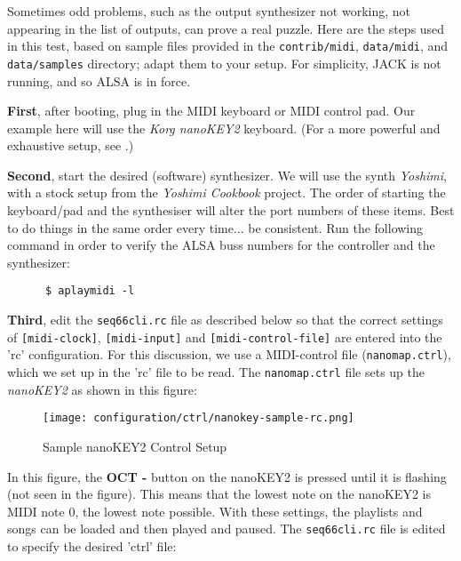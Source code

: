    Sometimes odd problems, such as the output synthesizer not working, not
   appearing in the list of outputs, can prove a real puzzle.
   Here are the steps used in this test, based on sample files provided in the
   \texttt{contrib/midi}, \texttt{data/midi}, and \texttt{data/samples}
   directory; adapt them to your setup.  For
   simplicity, JACK is not running, and so ALSA is in force.

   \textbf{First}, after booting, plug in the MIDI keyboard or MIDI control
   pad.  Our example here will use the \textsl{Korg nanoKEY2} keyboard.  
   (For a more powerful and exhaustive setup, see
   .)

   \textbf{Second}, start the desired (software) synthesizer.  We will use the
   synth \textsl{Yoshimi}, with a stock setup from the
   \textsl{Yoshimi Cookbook} project.
   The order of starting the keyboard/pad and the synthesiser
   will alter the port numbers of these items.  Best to do things in the same
   order every time... be consistent.
   Run the following command in order to verify the ALSA buss numbers for
   the controller and the synthesizer:

   \begin{verbatim}
      $ aplaymidi -l
   \end{verbatim}

   \textbf{Third}, edit the \texttt{seq66cli.rc}
   file as described below so that the correct settings of
   \texttt{[midi-clock]}, \texttt{[midi-input]} and
   \texttt{[midi-control-file]} are entered into the 'rc' configuration.
   For this discussion, we use a MIDI-control file 
   (\texttt{nanomap.ctrl}), which we set up
   in the 'rc' file to be read.
   The \texttt{nanomap.ctrl} file sets up the \textsl{nanoKEY2} as
   shown in this figure:

\begin{figure}[H]
   \centering 
   \texttt{[image: configuration/ctrl/nanokey-sample-rc.png]}
   \caption{Sample nanoKEY2 Control Setup}
   \label{fig:headless_nanokey2_setup}
\end{figure}

   In this figure, the \textbf{OCT -} button on the nanoKEY2 is pressed until
   it is flashing (not seen in the figure).
   This means that the lowest note on the nanoKEY2 is MIDI note 0, the lowest
   note possible.  With these settings, the playlists and songs can be loaded
   and then played and paused.
   The \texttt{seq66cli.rc} file is edited to specify the desired 'ctrl' file:


